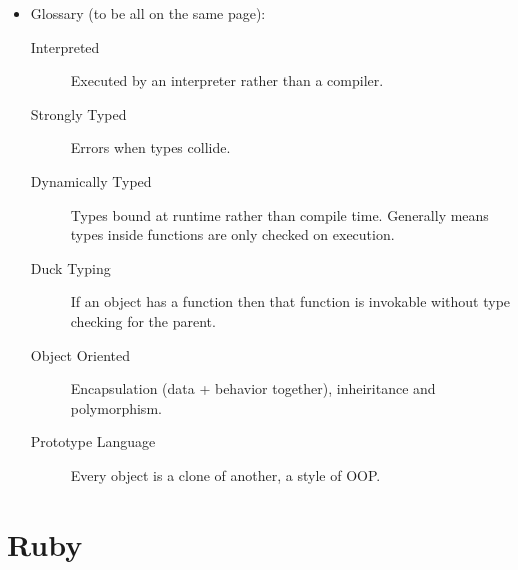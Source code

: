 \documentclass[10pt, twocolumn, landscape]{article}
\begin{document}
\begin{itemize}
    \item Glossary (to be all on the same page):
        \begin{description}
            \item[Interpreted] Executed by an interpreter rather than a
                compiler.
            \item[Strongly Typed] Errors when types collide.
            \item[Dynamically Typed] Types bound at runtime rather than compile
                time. Generally means types inside functions are only checked on
                execution.
            \item[Duck Typing] If an object has a function then that function is
                invokable without type checking for the parent.
            \item[Object Oriented] Encapsulation (data + behavior together),
                inheiritance and polymorphism.
            \item[Prototype Language] Every object is a clone of another, a
                style of OOP.\@
        \end{description}
\end{itemize}

\section{Ruby}
\end{document}
